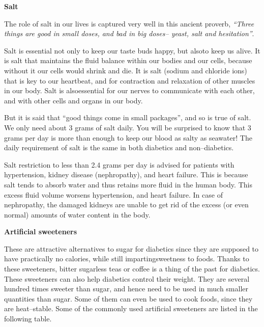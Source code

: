 \noindent\textbf{Salt}

The role of salt in our lives is captured very well in this ancient proverb, \textit{“Three things are good in small doses, and bad in big doses– yeast, salt and hesitation”}.

Salt is essential not only to keep our taste buds happy, but also\break to keep us alive. It is salt that maintains the fluid balance within our bodies and our cells, because without it our cells would shrink and die. It is salt (sodium and chloride ions) that is key to our heartbeat, and for contraction and relaxation of other muscles in our body. Salt is also\break essential for our nerves to communicate with each other, and with other cells and organs in our body.

But it is said that “good things come in small packages”, and so is true of salt. We only need about 3 grams of salt daily. You will be surprised to know that 3 grams per day is more than enough to keep our blood as salty as seawater! The daily requirement of salt is the same in both diabetics and non–diabetics.

Salt restriction to less than 2.4 grams per day is advised for patients with hypertension, kidney disease (nephropathy), and heart failure. This is because salt tends to absorb water and thus retains more fluid in the human body. This excess fluid volume worsens hypertension, and heart failure. In case of nephropathy, the damaged kidneys are unable to get rid of the excess (or even normal) amounts of water content in the body.

\noindent\textbf{Artificial sweeteners}

These are attractive alternatives to sugar for diabetics since they are supposed to have practically no calories, while still imparting\break sweetness to foods. Thanks to these sweeteners, bitter sugarless teas or coffee is a thing of the past for diabetics. These sweeteners can also help diabetics control their weight. They are several hundred times sweeter than sugar, and hence need to be used in much smaller quanti\-ties than sugar. Some of them can even be used to cook foods, since they are heat–stable. Some of the commonly used artificial sweete\-ners are listed in the following table.

